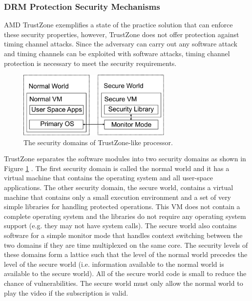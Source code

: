     \subsubsection{DRM Protection Security Mechanisms}
    AMD TrustZone \cite{trustzone} exemplifies a state of the practice solution 
    that can enforce these security properties, however, TrustZone does not 
    offer protection against timing channel attacks. Since the adversary can 
    carry out any software attack and timing channels can be exploited with 
    software attacks, timing channel protection is necessary to meet the 
    security requirements. 

    \begin{figure}
        \begin{center}
            \includegraphics[width=3in]{figs/worlds.pdf}
            \caption{The security domains of TrustZone-like processor.}
            \label{fig:tz_domains}
        \end{center}
    \end{figure}
    
    TrustZone separates the software modules into two security domains as shown 
    in Figure \ref{fig:tz_domains} . The first security domain is called the 
    normal world and it has a virtual machine that contains the operating 
    system and all user-space applications. The other security domain, the 
    secure world, contains a virtual machine that contains only a small 
    execution environment and a set of very simple libraries for handling 
    protected operations. This VM does not contain a complete operating system 
    and the libraries do not require any operating system support (e.g. they 
    may not have system calls). The secure world also contains software for a 
    simple monitor mode that handles context switching between the two domains 
    if they are time multiplexed on the same core. The security levels of these 
    domains form a lattice such that the level of the normal world precedes the 
    level of the secure world (i.e. information available to the normal world 
    is available to the secure world). All of the secure world code 
    is small to reduce the chance of vulnerabilities. The secure world must 
    only allow the normal world to play the video if the subscription is valid. 


